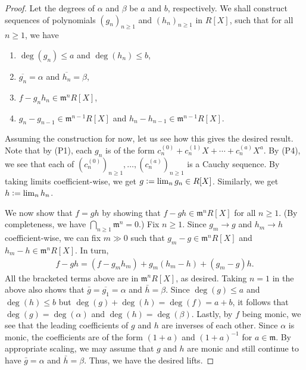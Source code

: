 \begin{proof} 
	Let the degrees of $\alpha$ and $\beta$ be $a$ and $b$, respectively. We shall construct sequences of polynomials $(g_{n})_{n \ge 1}$ and $(h_{n})_{n \ge 1}$ in $R[X]$, such that for all $n \ge 1$, we have
	\begin{enumerate}[label=(P\arabic*)]
		\item $\deg(g_{n}) \le a$ and $\deg(h_{n}) \le b$,
		\item $\overline{g_{n}} = \alpha$ and $\overline{h_{n}} = \beta$,
		\item $f - g_{n} h_{n} \in \mathfrak{m}^{n} R[X]$,
		\item $g_{n} - g_{n - 1} \in \mathfrak{m}^{n - 1} R[X]$ and $h_{n} - h_{n - 1} \in \mathfrak{m}^{n - 1} R[X]$.
	\end{enumerate}

	Assuming the construction for now, let us see how this gives the desired result. \newline
	Note that by (P1), each $g_{n}$ is of the form $c_{n}^{(0)} + c_{n}^{(1)} X + \cdots + c_{n}^{(a)} X^{a}$. \newline
	By (P4), we see that each of $(c_{n}^{(0)})_{n \ge 1}, \ldots, (c_{n}^{(a)})_{n \ge 1}$ is a Cauchy sequence. By taking limits coefficient-wise, we get $g \vcentcolon= \lim_{n} g_{n} \in R[X]$. \newline
	Similarly, we get $h \vcentcolon= \lim_{n} h_{n}$. 

	We now show that $f = gh$ by showing that $f - gh \in \mathfrak{m}^{n} R[X]$ for all $n \ge 1$. (By completeness, we have $\bigcap_{n \ge 1} \mathfrak{m}^{n} = 0$.) \newline
	Fix $n \ge 1$. Since $g_{m} \to g$ and $h_{m} \to h$ coefficient-wise, we can fix $m \gg 0$ such that $g_{m} - g \in \mathfrak{m}^{n} R[X]$ and $h_{m} - h \in \mathfrak{m}^{n} R[X]$. In turn,
	\begin{align*} 
		f - gh = (f - g_{m} h_{m}) + g_{m} (h_{m} - h) + (g_{m} - g)h.
	\end{align*}
	All the bracketed terms above are in $\mathfrak{m}^{n} R[X]$, as desired. \newline
	Taking $n = 1$ in the above also shows that $\bar{g} = \overline{g_{1}} = \alpha$ and $\bar{h} = \beta$. Since $\deg(g) \le a$ and $\deg(h) \le b$ but $\deg(g) + \deg(h) = \deg(f) = a + b$, it follows that $\deg(g) = \deg(\alpha)$ and $\deg(h) = \deg(\beta)$. \newline
	Lastly, by $f$ being monic, we see that the leading coefficients of $g$ and $h$ are inverses of each other. Since $\alpha$ is monic, the coefficients are of the form $(1 + a)$ and $(1 + a)^{-1}$ for $a \in \mathfrak{m}$. By appropriate scaling, we may assume that $g$ and $h$ are monic and still continue to have $\bar{g} = \alpha$ and $\bar{h} = \beta$. Thus, we have the desired lifts.


\end{proof}
